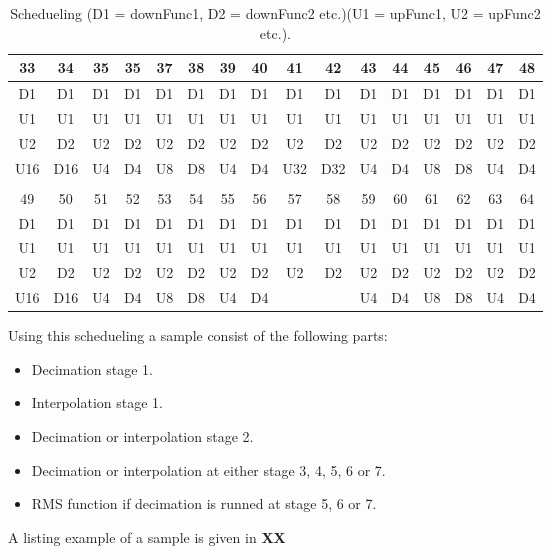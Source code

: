 \begin{table}[H]
\begin{tabular}{|c|c|c|c|c|c|c|c|c|c|c|c|c|c|c|c|}
\rowcolor[HTML]{C0C0C0} 
33  & 34  & 35 & 35 & 37 & 38 & 39 & 40 & 41  & 42  & 43 & 44 & 45 & 46 & 47 & 48 \\ \hline
D1  & D1  & D1 & D1 & D1 & D1 & D1 & D1 & D1  & D1  & D1 & D1 & D1 & D1 & D1 & D1 \\ \hline
U1  & U1  & U1 & U1 & U1 & U1 & U1 & U1 & U1  & U1  & U1 & U1 & U1 & U1 & U1 & U1 \\ \hline
U2  & D2  & U2 & D2 & U2 & D2 & U2 & D2 & U2  & D2  & U2 & D2 & U2 & D2 & U2 & D2 \\ \hline
U16 & D16 & U4 & D4 & U8 & D8 & U4 & D4 & U32 & D32 & U4 & D4 & U8 & D8 & U4 & D4 \\ \hline
\rowcolor[HTML]{C0C0C0} 
\multicolumn{16}{|c|}{\cellcolor[HTML]{C0C0C0}Sample}                             \\ \hline
\rowcolor[HTML]{C0C0C0} 
49  & 50  & 51 & 52 & 53 & 54 & 55 & 56 & 57  & 58  & 59 & 60 & 61 & 62 & 63 & 64 \\ \hline
D1  & D1  & D1 & D1 & D1 & D1 & D1 & D1 & D1  & D1  & D1 & D1 & D1 & D1 & D1 & D1 \\ \hline
U1  & U1  & U1 & U1 & U1 & U1 & U1 & U1 & U1  & U1  & U1 & U1 & U1 & U1 & U1 & U1 \\ \hline
U2  & D2  & U2 & D2 & U2 & D2 & U2 & D2 & U2  & D2  & U2 & D2 & U2 & D2 & U2 & D2 \\ \hline
U16 & D16 & U4 & D4 & U8 & D8 & U4 & D4 &     &     & U4 & D4 & U8 & D8 & U4 & D4 \\ \hline
\end{tabular}
\caption{Schedueling (D1 = downFunc1, D2 = downFunc2 etc.)(U1 = upFunc1, U2 = upFunc2 etc.).}
\label{tb:schedueling}
\end{table}


Using this schedueling a sample consist of the following parts:
\begin{itemize}
\item Decimation stage 1.
\item Interpolation stage 1.
\item Decimation or interpolation stage 2.
\item Decimation or interpolation at either stage 3, 4, 5, 6 or 7. 
\item RMS function if decimation is runned at stage 5, 6 or 7.
\end{itemize}

A listing example of a sample is given in \textbf{XX} 

